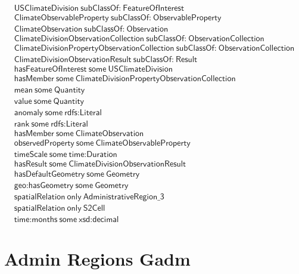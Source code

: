 \begin{align}
  \textsf{USClimateDivision}~\textsf{subClassOf:}~\textsf{FeatureOfInterest}\\
  \textsf{ClimateObservableProperty}~\textsf{subClassOf:}~\textsf{ObservableProperty}\\
  \textsf{ClimateObservation}~\textsf{subClassOf:}~\textsf{Observation}\\
  \textsf{ClimateDivisionObservationCollection}~\textsf{subClassOf:}~\textsf{ObservationCollection}\\
  \textsf{ClimateDivisionPropertyObservationCollection}~\textsf{subClassOf:}~\textsf{ObservationCollection}\\
  \textsf{ClimateDivisionObservationResult}~\textsf{subClassOf:}~\textsf{Result}\\
  \textsf{hasFeatureOfInterest}~\textsf{some}~\textsf{USClimateDivision}\\
  \textsf{hasMember}~\textsf{some}~\textsf{ClimateDivisionPropertyObservationCollection}\\
  \textsf{mean}~\textsf{some}~\textsf{Quantity}\\
  \textsf{value}~\textsf{some}~\textsf{Quantity}\\
  \textsf{anomaly}~\textsf{some}~\textsf{rdfs:Literal}\\
  \textsf{rank}~\textsf{some}~\textsf{rdfs:Literal}\\
  \textsf{hasMember}~\textsf{some}~\textsf{ClimateObservation}\\
  \textsf{observedProperty}~\textsf{some}~\textsf{ClimateObservableProperty}\\
  \textsf{timeScale}~\textsf{some}~\textsf{time:Duration}\\
  \textsf{hasResult}~\textsf{some}~\textsf{ClimateDivisionObservationResult}\\
  \textsf{hasDefaultGeometry}~\textsf{some}~\textsf{Geometry}\\
  \textsf{geo:hasGeometry}~\textsf{some}~\textsf{Geometry}\\
  \textsf{spatialRelation}~\textsf{only}~\textsf{AdministrativeRegion\_3}\\
  \textsf{spatialRelation}~\textsf{only}~\textsf{S2Cell}\\
  \textsf{time:months}~\textsf{some}~\textsf{xsd:decimal}\end{align}



\section{Admin Regions Gadm}
\label{sec:admin-regions-gadm}
